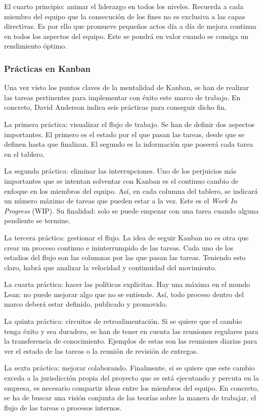 El cuarto principio: animar el liderazgo en todos los niveles. Recuerda a cada miembro del equipo que la consecución de los fines no es exclusiva a las capas directivas. Es por ello que promueve pequeños actos día a día de mejora continua en todos los aspectos del equipo. Este se pondrá en valor cuando se consiga un rendimiento óptimo.

\subsubsection{Prácticas en Kanban}
Una vez visto los puntos claves de la mentalidad de Kanban, se han de realizar las tareas pertinentes para implementar con éxito este marco de trabajo. En concreto, David Anderson indica seis prácticas para conseguir dicho fin.

La primera práctica: visualizar el flujo de trabajo. Se han de definir dos aspectos importantes. El primero es el estado por el que pasan las tareas, desde que se definen hasta que finalizan. El segundo es la información que poseerá cada tarea en el tablero.

La segunda práctica: eliminar las interrupciones. Uno de los perjuicios más importantes que se intentan solventar con Kanban es el continuo cambio de enfoque en los miembros del equipo. Así, en cada columna del tablero, se indicará un número máximo de tareas que pueden estar a la vez. Este es el \textit{Work In Progress} (WIP). Su finalidad: solo se puede empezar con una tarea cuando alguna pendiente se termine.

La tercera práctica: gestionar el flujo. La idea de seguir Kanban no es otra que crear un proceso continuo e ininterrumpido de las tareas. Cada uno de los estadios del flujo son las columnas por las que pasan las tareas. Teniendo esto claro, habrá que analizar la velocidad y continuidad del movimiento.

La cuarta práctica: hacer las políticas explícitas. Hay una máxima en el mundo Lean: no puede mejorar algo que no se entiende. Así, todo proceso dentro del marco deberá estar definido, publicado y promovido.

La quinta práctica: circuitos de retroalimentación. Si se quiere que el cambio tenga éxito y sea duradero, se han de tener en cuenta las reuniones regulares para la transferencia de conocimiento. Ejemplos de estas son las reuniones diarias para ver el estado de las tareas o la reunión de revisión de entregas.

La sexta práctica: mejorar colaborando. Finalmente, si se quiere que este cambio exceda a la jurisdicción propia del proyecto que se está ejecutando y percuta en la empresa, es necesario compartir ideas entre los miembros del equipo. En concreto, se ha de buscar una visión conjunta de las teorías sobre la manera de trabajar, el flujo de las tareas o procesos internos.

